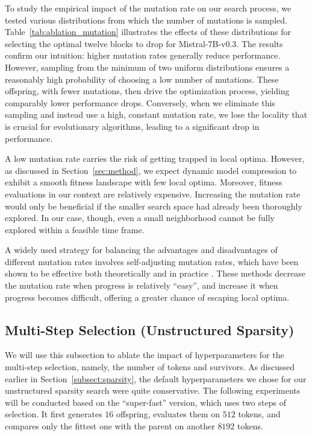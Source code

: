 To study the empirical impact of the mutation rate on our search process, we tested various distributions from which the number of mutations is sampled. Table~\ref{tab:ablation_mutation} illustrates the effects of these distributions for selecting the optimal twelve blocks to drop for Mistral-7B-v0.3. The results confirm our intuition: higher mutation rates generally reduce performance. However, sampling from the minimum of two uniform distributions ensures a reasonably high probability of choosing a low number of mutations. These offspring, with fewer mutations, then drive the optimization process, yielding comparably lower performance drops. Conversely, when we eliminate this sampling and instead use a high, constant mutation rate, we lose the locality that is crucial for evolutionary algorithms, leading to a significant drop in performance.



A low mutation rate carries the risk of getting trapped in local optima. However, as discussed in Section~\ref{sec:method}, we expect dynamic model compression to exhibit a smooth fitness landscape with few local optima. Moreover, fitness evaluations in our context are relatively expensive. Increasing the mutation rate would only be beneficial if the smaller search space had already been thoroughly explored. In our case, though, even a small neighborhood cannot be fully explored within a feasible time frame.

A widely used strategy for balancing the advantages and disadvantages of different mutation rates involves self-adjusting mutation rates, which have been shown to be effective both theoretically and in practice \citep{kern_one_fifth_update_rule, doerr_lengler_self_adjusting_mutation}. These methods decrease the mutation rate when progress is relatively ``easy'', and increase it when progress becomes difficult, offering a greater chance of escaping local optima.



\subsection{Multi-Step Selection (Unstructured Sparsity)}
\label{app:evo_search_ablations_sparsity}
We will use this subsection to ablate the impact of hyperparameters for the multi-step selection, namely, the number of tokens and survivors. As discussed earlier in Section~\ref{subsect:sparsity}, the default hyperparameters we chose for our unstructured sparsity search were quite conservative. The following experiments will be conducted based on the ``super-fast'' version, which uses two steps of selection. It first generates $16$ offspring, evaluates them on $512$ tokens, and compares only the fittest one with the parent on another $8192$ tokens. 

